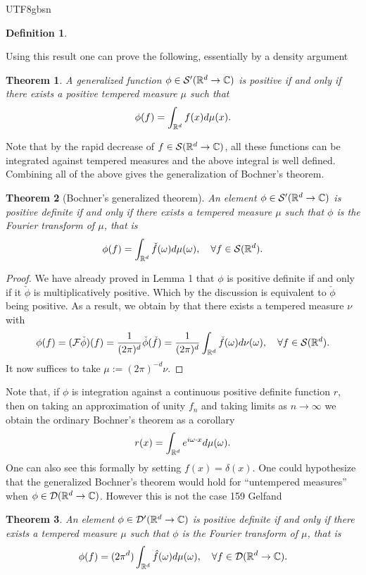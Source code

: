 \documentclass[12pt]{article}
\newtheorem{theorem}{Theorem}
\newtheorem{definition}{Definition}
\begin{document}
\begin{CJK*}{UTF8}{gbsn}
\begin{definition}
	\end{definition}

	Using this result one can prove the following, essentially by a density argument
	\begin{theorem}
		A generalized function $\phi\in \mathcal{S}'({\mathbb R}^d\to\mathbb{C})$ is positive if and only if there exists a positive tempered measure $\mu $ such that
		\begin{equation*}
			\phi(f)=\int_{{\mathbb R}^d} f(x)d\mu(x).
		\end{equation*}
	\end{theorem}
	Note that by the rapid decrease of $f\in {\mathcal S}({\mathbb R}^d\to\mathbb{C})$, all these functions can be integrated against tempered measures and the above integral is well defined. Combining all of the above gives the generalization of Bochner's theorem.
	\begin{theorem}[Bochner's generalized theorem]
		An element $\phi\in {\mathcal S}'({\mathbb R}^d\to\mathbb{C})$ is positive definite if and only if there exists a tempered measure $\mu $ such that $\phi$ is the Fourier transform of $\mu $, that is
		\begin{equation*}
			\phi(f)=\int_{{\mathbb R}^d} \check{f}(\omega) d \mu (\omega),\quad\forall f\in {\mathcal S}({\mathbb R}^d).
		\end{equation*}

	\end{theorem}
	\begin{proof}
		We have already proved in Lemma 1 that $\phi$ is positive definite if and only if it $\check{\phi}$ is multiplicatively positive. Which by the discussion is equivalent to $\check{\phi}$ being positive. As  a result, we obtain by  that there exists a tempered measure $\nu $ with
		\begin{equation*}
			\phi(f)=(\mathcal{F}\check{\phi})(f)=\frac{1}{(2\pi)^{d}}\check{\phi}(\check{f})=\frac{1}{(2\pi)^{d}}\int_{{\mathbb R}^d} \check{f}(\omega) d \nu (\omega),\quad\forall f\in {\mathcal S}({\mathbb R}^d).
		\end{equation*}
		It now suffices to take $\mu :=(2\pi )^{-d} \nu$.
	\end{proof}
	Note that, if $\phi$ is integration against a continuous positive definite function $r$, then on taking an approximation of unity  $f_n$ and taking limits as $n\to\infty$ we obtain the ordinary Bochner's theorem as a corollary
	\begin{equation*}
		r(x)=\int_{{\mathbb R}^d}e^{i\omega \cdot x} d \mu(\omega) .
	\end{equation*}
	One can also see this formally by setting $f(x)=\delta (x)$. One could hypothesize that the generalized Bochner's theorem would hold for ``untempered measures'' when $\phi\in \mathcal{D}({\mathbb R}^d\to\mathbb{C})$. However this is not the case 159 Gelfand
	\begin{theorem}
		An element $\phi\in \mathcal{D}'({\mathbb R}^d\to \mathbb{C})$ is positive definite if and only if there exists a tempered measure $\mu $ such that $\phi$ is the Fourier transform of $\mu $, that is
		\begin{equation*}
			\phi(f)=(2\pi^d)\int_{{\mathbb R}^d} \hat{f}(\omega) d \mu (\omega),\quad\forall f\in \mathcal{D}({\mathbb R}^d\to\mathbb{C}).
		\end{equation*}


\end{theorem}
\end{CJK*}
\end{document}
